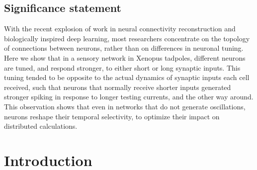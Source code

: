 \documentclass{article}
\begin{document}
\begin{flushleft}
\section*{Significance statement}
With the recent explosion of work in neural connectivity reconstruction and biologically inspired deep learning, most researchers concentrate on the topology of connections between neurons, rather than on differences in neuronal tuning. Here we show that in a sensory network in Xenopus tadpoles, different neurons are tuned, and respond stronger, to either short or long synaptic inputs. This tuning tended to be opposite to the actual dynamics of synaptic inputs each cell received, such that neurons that normally receive shorter inputs generated stronger spiking in response to longer testing currents, and the other way around. This observation shows that even in networks that do not generate oscillations, neurons reshape their temporal selectivity, to optimize their impact on distributed calculations. 
\bigskip

\end{flushleft} %

\section*{Introduction}




\end{document}
